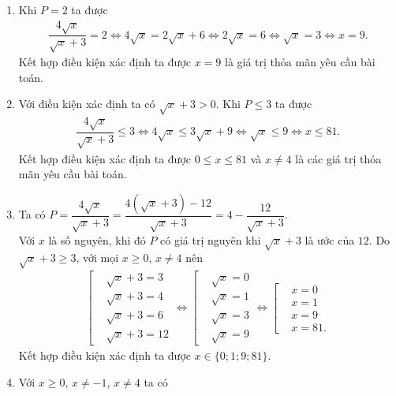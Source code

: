 \begin{bt}
{\begin{enumerate}
			Khi đó, $P = \dfrac{4\sqrt{4}}{\sqrt{4}+3} = \dfrac{8}{5}$.
			\item Khi $P=2$ ta được
			\allowdisplaybreaks
			\begin{eqnarray*}
				\dfrac{4\sqrt{x}}{\sqrt{x}+3} = 2 \Leftrightarrow 4\sqrt{x}=2\sqrt{x}+6 \Leftrightarrow 2\sqrt{x}=6 \Leftrightarrow \sqrt{x}=3 \Leftrightarrow x=9.
			\end{eqnarray*}
			Kết hợp điều kiện xác định ta được $x=9$ là giá trị thỏa mãn yêu cầu bài toán.
			\item Với điều kiện xác định ta có $\sqrt{x}+3 > 0$. Khi $P \leq 3$ ta được
			\allowdisplaybreaks
			\begin{eqnarray*}
				\dfrac{4\sqrt{x}}{\sqrt{x}+3} \leq 3 \Leftrightarrow 4\sqrt{x} \leq 3\sqrt{x}+9 \Leftrightarrow \sqrt{x} \leq 9 \Leftrightarrow x \leq 81.
			\end{eqnarray*}
			Kết hợp điều kiện xác định ta được $0 \leq x \leq 81$ và $x \neq 4$ là các giá trị thỏa mãn yêu cầu bài toán.
			\item Ta có $P = \dfrac{4\sqrt{x}}{\sqrt{x}+3} = \dfrac{4\left(\sqrt{x}+3\right)-12}{\sqrt{x}+3} = 4 - \dfrac{12}{\sqrt{x}+3}$.\\
			Với $x$ là số nguyên, khi đó $P$ có giá trị nguyên khi $\sqrt{x}+3$ là ước của $12$. Do $\sqrt{x}+3 \geq 3$, với mọi $x \geq 0$, $x \neq 4$ nên
			\allowdisplaybreaks
			\begin{eqnarray*}
				\left[\begin{aligned}&\sqrt{x}+3=3 \\&\sqrt{x}+3=4 \\&\sqrt{x}+3=6 \\&\sqrt{x}+3=12\end{aligned}\right. \Leftrightarrow \left[\begin{aligned}&\sqrt{x}=0 \\&\sqrt{x}=1 \\&\sqrt{x}=3 \\&\sqrt{x}=9\end{aligned}\right. \Leftrightarrow \left[\begin{aligned}&x=0 \\&x=1 \\&x=9 \\&x=81.\end{aligned}\right.
			\end{eqnarray*}
			Kết hợp điều kiện xác định ta được $x \in \{0;1;9;81\}$.
			\item Với $x\geq 0$, $x \neq -1$, $x \neq 4$ ta có
			\allowdisplaybreaks

\end{enumerate}}
\end{bt}
